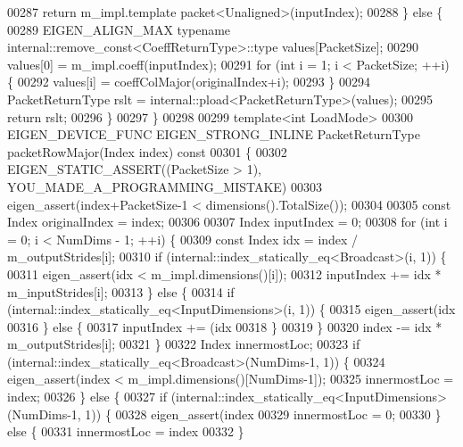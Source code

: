 \begin{DoxyCode}
00287       \textcolor{keywordflow}{return} m\_impl.template packet<Unaligned>(inputIndex);
00288     \} \textcolor{keywordflow}{else} \{
00289       EIGEN\_ALIGN\_MAX \textcolor{keyword}{typename} internal::remove\_const<CoeffReturnType>::type values[PacketSize];
00290       values[0] = m\_impl.coeff(inputIndex);
00291       \textcolor{keywordflow}{for} (\textcolor{keywordtype}{int} i = 1; i < PacketSize; ++i) \{
00292         values[i] = coeffColMajor(originalIndex+i);
00293       \}
00294       PacketReturnType rslt = internal::pload<PacketReturnType>(values);
00295       \textcolor{keywordflow}{return} rslt;
00296     \}
00297   \}
00298 
00299   \textcolor{keyword}{template}<\textcolor{keywordtype}{int} LoadMode>
00300   EIGEN\_DEVICE\_FUNC EIGEN\_STRONG\_INLINE PacketReturnType packetRowMajor(Index index)\textcolor{keyword}{ const}
00301 \textcolor{keyword}{  }\{
00302     EIGEN\_STATIC\_ASSERT((PacketSize > 1), YOU\_MADE\_A\_PROGRAMMING\_MISTAKE)
00303     eigen\_assert(index+PacketSize-1 < dimensions().TotalSize());
00304 
00305     \textcolor{keyword}{const} Index originalIndex = index;
00306 
00307     Index inputIndex = 0;
00308     \textcolor{keywordflow}{for} (\textcolor{keywordtype}{int} i = 0; i < NumDims - 1; ++i) \{
00309       \textcolor{keyword}{const} Index idx = index / m\_outputStrides[i];
00310       \textcolor{keywordflow}{if} (internal::index\_statically\_eq<Broadcast>(i, 1)) \{
00311         eigen\_assert(idx < m\_impl.dimensions()[i]);
00312         inputIndex += idx * m\_inputStrides[i];
00313       \} \textcolor{keywordflow}{else} \{
00314         \textcolor{keywordflow}{if} (internal::index\_statically\_eq<InputDimensions>(i, 1)) \{
00315           eigen\_assert(idx %
00316         \} \textcolor{keywordflow}{else} \{
00317           inputIndex += (idx %
00318         \}
00319       \}
00320       index -= idx * m\_outputStrides[i];
00321     \}
00322     Index innermostLoc;
00323     \textcolor{keywordflow}{if} (internal::index\_statically\_eq<Broadcast>(NumDims-1, 1)) \{
00324       eigen\_assert(index < m\_impl.dimensions()[NumDims-1]);
00325       innermostLoc = index;
00326     \} \textcolor{keywordflow}{else} \{
00327       \textcolor{keywordflow}{if} (internal::index\_statically\_eq<InputDimensions>(NumDims-1, 1)) \{
00328         eigen\_assert(index %
00329         innermostLoc = 0;
00330       \} \textcolor{keywordflow}{else} \{
00331         innermostLoc = index %
00332       \}

\end{DoxyCode}
